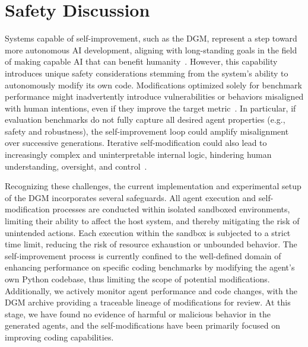 \documentclass{article} %
\begin{document}
\section{Safety Discussion}
\label{sec:safety}

Systems capable of self-improvement, such as the DGM, represent a step toward more autonomous AI development, aligning with long-standing goals in the field of making capable AI that can benefit humanity~\citep{schmidhuber1987evolutionary, clune2019ai, markoff2016machines, lehman2023machine}. However, this capability introduces unique safety considerations stemming from the system's ability to autonomously modify its own code. Modifications optimized solely for benchmark performance might inadvertently introduce vulnerabilities or behaviors misaligned with human intentions, even if they improve the target metric~\citep{bostrom2020ethical}. In particular, if evaluation benchmarks do not fully capture all desired agent properties (e.g., safety and robustness), the self-improvement loop could amplify misalignment over successive generations. Iterative self-modification could also lead to increasingly complex and uninterpretable internal logic, hindering human understanding, oversight, and control~\citep{sheth2025safety, anwar2024foundational, greenblatt2024alignment, ganguli2022red}.

Recognizing these challenges, the current implementation and experimental setup of the DGM incorporates several safeguards. All agent execution and self-modification processes are conducted within isolated sandboxed environments, limiting their ability to affect the host system, and thereby mitigating the risk of unintended actions. Each execution within the sandbox is subjected to a strict time limit, reducing the risk of resource exhaustion or unbounded behavior. The self-improvement process is currently confined to the well-defined domain of enhancing performance on specific coding benchmarks by modifying the agent's own Python codebase, thus limiting the scope of potential modifications. Additionally, we actively monitor agent performance and code changes, with the DGM archive providing a traceable lineage of modifications for review. At this stage, we have found no evidence of harmful or malicious behavior in the generated agents, and the self-modifications have been primarily focused on improving coding capabilities.
\end{document}
